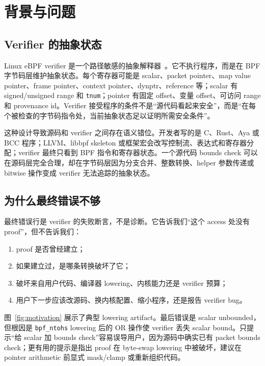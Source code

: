 \documentclass[letterpaper,twocolumn,10pt]{article}
\newcommand{\code}[1]{\texttt{#1}}
\begin{document}
\section{背景与问题}

\subsection{Verifier 的抽象状态}

Linux eBPF verifier 是一个路径敏感的抽象解释器~\cite{gershuni2019simple,cousot1977}。它不执行程序，而是在 BPF 字节码层维护抽象状态。每个寄存器可能是 scalar、packet pointer、map value pointer、frame pointer、context pointer、dynptr、reference 等；scalar 有 signed/unsigned range 和 \code{tnum}；pointer 有固定 offset、变量 offset、可访问 range 和 provenance id。Verifier 接受程序的条件不是“源代码看起来安全”，而是“在每个被检查的字节码指令处，当前抽象状态足以证明所需安全条件”。

这种设计导致源码和 verifier 之间存在语义错位。开发者写的是 C、Rust、Aya 或 BCC 程序；LLVM、libbpf skeleton 或框架宏会改写控制流、表达式和寄存器分配；verifier 最终只看到 BPF 指令和寄存器状态。一个源代码 bounds check 可以在源码层完全合理，却在字节码层因为分支合并、整数转换、helper 参数传递或 bitwise 操作变成 verifier 无法追踪的抽象状态。

\subsection{为什么最终错误不够}

最终错误行是 verifier 的失败断言，不是诊断。它告诉我们“这个 access 处没有 proof”，但不告诉我们：
\begin{enumerate}
  \item proof 是否曾经建立；
  \item 如果建立过，是哪条转换破坏了它；
  \item 破坏来自用户代码、编译器 lowering、内核能力还是 verifier 预算；
  \item 用户下一步应该改源码、换内核配置、缩小程序，还是报告 verifier bug。
\end{enumerate}

图~\ref{fig:motivation} 展示了典型 lowering artifact。最后错误是 scalar unbounded，但根因是 \code{bpf\_ntohs} lowering 后的 OR 操作使 verifier 丢失 scalar bound。只提示“给 scalar 加 bounds check”容易误导用户，因为源码中确实已有 packet bounds check；更有用的提示是指出 proof 在 byte-swap lowering 中被破坏，建议在 pointer arithmetic 前显式 mask/clamp 或重新组织代码。
\end{document}
